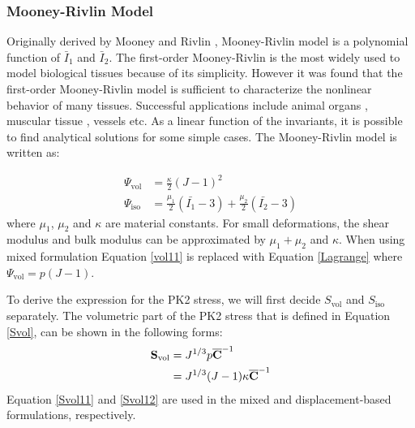 \subsubsection{Mooney-Rivlin Model}
Originally derived by Mooney \cite{Mooney} and Rivlin \cite{Rivlin}, Mooney-Rivlin model is a polynomial function of $\bar{I}_1$ and $\bar{I}_2$. The first-order Mooney-Rivlin is the most widely used to model biological tissues because of its simplicity. However it was found that the first-order Mooney-Rivlin model is sufficient to characterize the nonlinear behavior of many tissues. Successful applications include animal organs \cite{Wall}, muscular tissue \cite{Bols2}, vessels \cite{Navidbakhsh} etc. As a linear function of the invariants, it is possible to find analytical solutions for some simple cases. The Mooney-Rivlin model is written as:

\begin{subequations}
\label{Mooney}
\begin{align}
\Psi_\mathrm{vol} &= \frac{\kappa}{2}(J - 1)^2 \label{vol11} \\
\Psi_\mathrm{iso} &= \frac{\mu_1}{2}(\bar{I_1} - 3) + \frac{\mu_2}{2}(\bar{I_2} - 3) \label{iso1}
\end{align}
\end{subequations}
where $\mu_1$, $\mu_2$ and $\kappa$ are material constants. For small deformations, the shear modulus and bulk modulus can be approximated by $\mu_1+\mu_2$ and $\kappa$. When using mixed formulation Equation \ref{vol11} is replaced with Equation \ref{Lagrange} where $\Psi_\mathrm{vol} = p(J - 1) $.

To derive the expression for the PK2 stress, we will first decide $S_\mathrm{vol}$ and $S_\mathrm{iso}$ separately. The volumetric part of the PK2 stress that is defined in Equation \ref{Svol}, can be shown in the following forms:
\begin{subequations}
\label{Svol1}
\begin{align}
\bold{S}_\mathrm{vol} &= J^{1/3}p{\overline{\bold{C}}}^{-1} \label{Svol11}\\
		      &= {J^{1/3}(J-1)}\kappa {\overline{\bold{C}}}^{-1} \label{Svol12}
\end{align}
\end{subequations}
Equation \ref{Svol11} and \ref{Svol12} are used in the mixed and displacement-based formulations, respectively.

